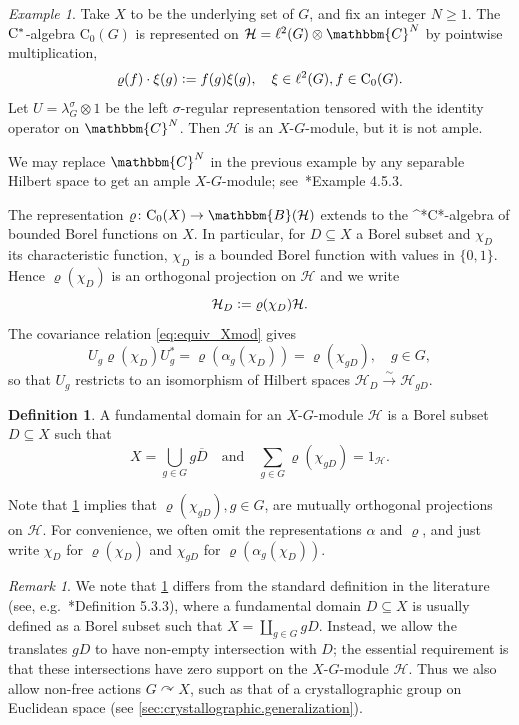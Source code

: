 \documentclass{amsart}
\numberwithin{figure}{section}
\numberwithin{equation}{section}
\numberwithin{table}{section}
\theoremstyle{plain}
\theoremstyle{definition}
\newtheorem{definition}[equation]{Definition}
\theoremstyle{remark}
\newtheorem{remark}[equation]{Remark}
\newtheorem{example}[equation]{Example}
\theoremstyle{nonumber}
\newcommand{\C}{\mathbb{C}}
\newcommand{\Bdd}{\mathbb{B}}
\newcommand{\Cst}{\relax\ifmmode\mathrm{C}^*\else\textup{C*}\fi}
\newcommand{\Cont}{\mathrm{C}}
\newcommand{\Co}{\mathrm{C}_0}
\newcommand{\defeq}{\mathrel{\vcentcolon=}}
\renewcommand{\mathbb}{\mathbbm} %
\begin{document}
\begin{example}\label{ex:standard_equivariant_ample_modules}
Take $X$ to be the underlying set of $G$, and fix an integer \(N\geq 1 \).
The \( \Cst \)-algebra \( \Cont_0(G) \) is represented on \(
\mathcal{H}=\ell^2(G)\otimes \C^N \) by
pointwise multiplication,
\[
\varrho(f)\cdot\xi(g)\defeq f(g)\xi(g),\quad \xi\in\ell^2(G), f\in\Co(G).
\]
Let $U=\lambda_G^\sigma\otimes 1$ be the left $\sigma$-regular
representation tensored with the identity operator on $\C^N$. Then $\mathcal{H}$ is
an $X$-$G$-module, but it is not ample.

We may replace $\C^N$ in the previous example by any separable Hilbert
space to get an ample $X$-$G$-module;
see~\cite{Willett-Yu:Higher_index_theory}*{Example 4.5.3}.
\end{example}

\medskip
The representation \( \varrho\colon \Co(X)\to\Bdd(\mathcal{H}) \)
extends to the \Cst-algebra of bounded Borel functions on \( X \).
In particular, for $D\subseteq X$ 
a Borel subset and $\chi_D$ its characteristic function, 
 \( \chi_D \) is a bounded Borel function with values in \(
\{0,1\} \). Hence \( \varrho(\chi_D) \) is an orthogonal 
projection on \( \mathcal{H}
\) and we write 
\[
  \mathcal{H}_D\defeq\varrho(\chi_D)\mathcal{H}.
\]
The covariance relation 
\eqref{eq:equiv_Xmod} gives
\begin{equation}\label{eq:spatial_unitary}
U_g\varrho(\chi_D)U_g^*=\varrho(\alpha_g(\chi_D))
=\varrho(\chi_{gD}),\quad
g\in G,
\end{equation}
so that $U_g$ restricts to an isomorphism of Hilbert spaces
$\mathcal{H}_D\xrightarrow{\sim}\mathcal{H}_{gD}$.

\begin{definition}\label{def:fundamental_domain}
A fundamental domain for an \(X\)-\(G\)-module \(\mathcal{H}\) is a Borel subset \( D\subseteq X \) such that
\[
    X=\bigcup_{g\in G}g\overline{D}\quad\text{and}\quad
    \sum_{g\in G}\varrho(\chi_{gD})=1_{\mathcal{H}}.
\]
\end{definition}

Note that \cref{def:fundamental_domain} implies that \(\varrho(\chi_{gD}),
g\in G\), are mutually orthogonal projections on \(\mathcal{H}\). For
convenience, we often omit the representations \( \alpha \) and 
\( \varrho \), and just write $\chi_D$ for $\varrho(\chi_D)$ and
$\chi_{gD}$ for $\varrho(\alpha_g(\chi_D))$. 

\begin{remark}
We note that \cref{def:fundamental_domain} differs from the 
standard definition in the literature (see,
e.g.~\cite{Willett-Yu:Higher_index_theory}*{Definition 5.3.3}), where a
fundamental domain \( D\subseteq X \) is usually
defined as a Borel subset such that \( X=\coprod_{g\in G}gD \).
Instead, we allow the translates
\( gD \) to have non-empty intersection with \( D \); 
the essential requirement is that 
these intersections have zero support on the \( X \)-\( G
\)-module \( \mathcal{H} \). 
Thus we also allow non-free actions \( G\curvearrowright X \), such as that
of a crystallographic group on Euclidean space (see
\cref{sec:crystallographic.generalization}).
\end{remark}
\end{document}
